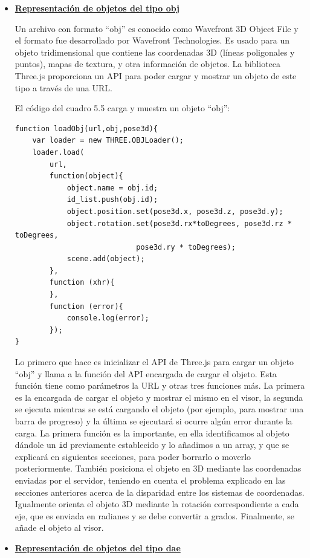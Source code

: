 \begin{itemize}
\item {\textbf{\underline{Representación de objetos del tipo obj}}

Un archivo con formato ``obj'' es conocido como Wavefront 3D Object File y el formato fue desarrollado por Wavefront Technologies. Es usado para un objeto tridimensional que contiene las coordenadas 3D (líneas poligonales y puntos), mapas de textura, y otra información de objetos. La biblioteca Three.js proporciona un API para poder cargar y mostrar un objeto de este tipo a través de una URL. 

El código del cuadro 5.5 carga y muestra un objeto ``obj'':

\begin{lstlisting}[caption= Carga y visualización de objetos ``obj'', label=cod.objetosobj]
function loadObj(url,obj,pose3d){
	var loader = new THREE.OBJLoader();
	loader.load(
		url,
		function(object){
			object.name = obj.id;
			id_list.push(obj.id);
			object.position.set(pose3d.x, pose3d.z, pose3d.y);
			object.rotation.set(pose3d.rx*toDegrees, pose3d.rz * toDegrees, 
							pose3d.ry * toDegrees);
			scene.add(object);
		},
		function (xhr){
		},
		function (error){
			console.log(error);
		});
}
\end{lstlisting}

Lo primero que hace es inicializar el API de Three.js para cargar un objeto ``obj'' y llama a la función del API encargada de cargar el objeto. Esta función tiene como parámetros la URL y otras tres funciones más. La primera es la encargada de cargar el objeto y mostrar el mismo en el visor, la segunda se ejecuta mientras se está cargando el objeto (por ejemplo, para mostrar una barra de progreso) y la última se ejecutará si ocurre algún error durante la carga. La primera función es la importante, en ella identificamos al objeto dándole un \texttt{id} previamente establecido y lo añadimos a un array, y que se explicará en siguientes secciones, para poder borrarlo o moverlo posteriormente. También posiciona el objeto en 3D mediante las coordenadas enviadas por el servidor, teniendo en cuenta el problema explicado en las secciones anteriores acerca de la disparidad entre los sistemas de coordenadas. Igualmente orienta el objeto 3D mediante la rotación correspondiente a cada eje, que es enviada en radianes y se debe convertir a grados.
Finalmente, se añade el objeto al visor.}

\item{\textbf{\underline{Representación de objetos del tipo dae}}

}
\end{itemize}
